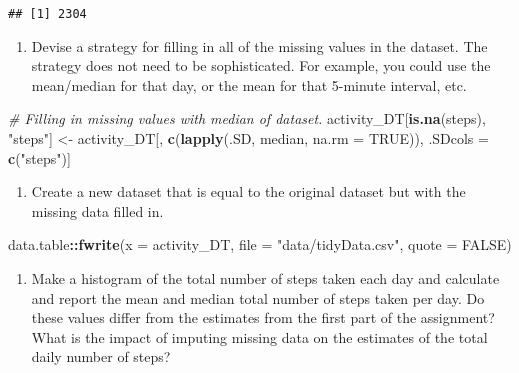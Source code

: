 \documentclass[]{article}
\newenvironment{Shaded}{\begin{snugshade}}{\end{snugshade}}
\newcommand{\KeywordTok}[1]{\textcolor[rgb]{0.13,0.29,0.53}{\textbf{#1}}}
\newcommand{\DataTypeTok}[1]{\textcolor[rgb]{0.13,0.29,0.53}{#1}}
\newcommand{\StringTok}[1]{\textcolor[rgb]{0.31,0.60,0.02}{#1}}
\newcommand{\CommentTok}[1]{\textcolor[rgb]{0.56,0.35,0.01}{\textit{#1}}}
\newcommand{\OtherTok}[1]{\textcolor[rgb]{0.56,0.35,0.01}{#1}}
\newcommand{\OperatorTok}[1]{\textcolor[rgb]{0.81,0.36,0.00}{\textbf{#1}}}
\newcommand{\NormalTok}[1]{#1}
\providecommand{\tightlist}{%
  \setlength{\itemsep}{0pt}\setlength{\parskip}{0pt}}
\begin{document}
\begin{verbatim}
## [1] 2304
\end{verbatim}

\begin{enumerate}
\def\labelenumi{\arabic{enumi}.}
\setcounter{enumi}{1}
\tightlist
\item
  Devise a strategy for filling in all of the missing values in the
  dataset. The strategy does not need to be sophisticated. For example,
  you could use the mean/median for that day, or the mean for that
  5-minute interval, etc.
\end{enumerate}

\begin{Shaded}
\begin{Highlighting}[]
\CommentTok{# Filling in missing values with median of dataset. }
\NormalTok{activity_DT[}\KeywordTok{is.na}\NormalTok{(steps), }\StringTok{"steps"}\NormalTok{] <-}\StringTok{ }\NormalTok{activity_DT[, }\KeywordTok{c}\NormalTok{(}\KeywordTok{lapply}\NormalTok{(.SD, median, }\DataTypeTok{na.rm =} \OtherTok{TRUE}\NormalTok{)), .SDcols =}\StringTok{ }\KeywordTok{c}\NormalTok{(}\StringTok{"steps"}\NormalTok{)]}
\end{Highlighting}
\end{Shaded}

\begin{enumerate}
\def\labelenumi{\arabic{enumi}.}
\setcounter{enumi}{2}
\tightlist
\item
  Create a new dataset that is equal to the original dataset but with
  the missing data filled in.
\end{enumerate}

\begin{Shaded}
\begin{Highlighting}[]
\NormalTok{data.table}\OperatorTok{::}\KeywordTok{fwrite}\NormalTok{(}\DataTypeTok{x =}\NormalTok{ activity_DT, }\DataTypeTok{file =} \StringTok{"data/tidyData.csv"}\NormalTok{, }\DataTypeTok{quote =} \OtherTok{FALSE}\NormalTok{)}
\end{Highlighting}
\end{Shaded}

\begin{enumerate}
\def\labelenumi{\arabic{enumi}.}
\setcounter{enumi}{3}
\tightlist
\item
  Make a histogram of the total number of steps taken each day and
  calculate and report the mean and median total number of steps taken
  per day. Do these values differ from the estimates from the first part
  of the assignment? What is the impact of imputing missing data on the
  estimates of the total daily number of steps?
\end{enumerate}
\end{document}
